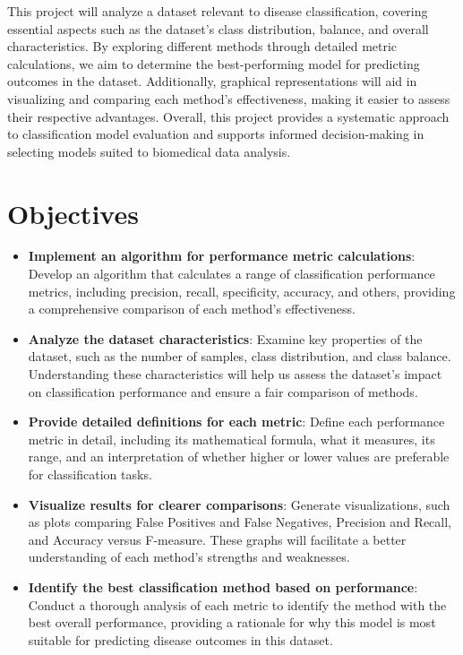 \documentclass{article}
\begin{document}
This project will analyze a dataset relevant to disease classification, covering essential aspects such as the dataset’s class distribution, balance, and overall characteristics. By exploring different methods through detailed metric calculations, we aim to determine the best-performing model for predicting outcomes in the dataset. Additionally, graphical representations will aid in visualizing and comparing each method’s effectiveness, making it easier to assess their respective advantages. Overall, this project provides a systematic approach to classification model evaluation and supports informed decision-making in selecting models suited to biomedical data analysis.

\section{Objectives}



\begin{itemize}
	\item \textbf{Implement an algorithm for performance metric calculations}: Develop an algorithm that calculates a range of classification performance metrics, including precision, recall, specificity, accuracy, and others, providing a comprehensive comparison of each method's effectiveness.
	
	\item \textbf{Analyze the dataset characteristics}: Examine key properties of the dataset, such as the number of samples, class distribution, and class balance. Understanding these characteristics will help us assess the dataset's impact on classification performance and ensure a fair comparison of methods.
	
	\item \textbf{Provide detailed definitions for each metric}: Define each performance metric in detail, including its mathematical formula, what it measures, its range, and an interpretation of whether higher or lower values are preferable for classification tasks.
	
	\item \textbf{Visualize results for clearer comparisons}: Generate visualizations, such as plots comparing False Positives and False Negatives, Precision and Recall, and Accuracy versus F-measure. These graphs will facilitate a better understanding of each method's strengths and weaknesses.
	
	\item \textbf{Identify the best classification method based on performance}: Conduct a thorough analysis of each metric to identify the method with the best overall performance, providing a rationale for why this model is most suitable for predicting disease outcomes in this dataset.
	

\end{itemize}
\end{document}
